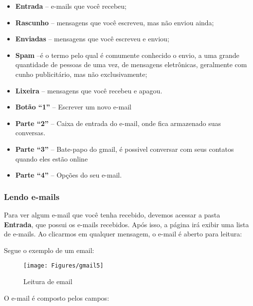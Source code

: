 \documentclass[hidelinks,12pt]{article}
\begin{document}
		\begin{itemize}
			\item \textbf{Entrada} – e-mails que você recebeu;
			
			\item \textbf{Rascunho} – mensagens que você escreveu, mas não enviou ainda;
			
			\item \textbf{Enviadas} – mensagens que você escreveu e enviou; 
			
			\item \textbf{Spam} –é o termo pelo qual é comumente conhecido o envio, a uma grande quantidade de pessoas de uma vez, de mensagens eletrônicas, geralmente com cunho publicitário, mas não exclusivamente;
			
			\item \textbf{Lixeira} – mensagens que você recebeu e apagou.
			
			\item \textbf{Botão “1”} – Escrever um novo e-mail
			
			\item \textbf{Parte “2”} – Caixa de entrada do e-mail, onde fica armazenado suas conversas.
			
			\item \textbf{Parte “3”} – Bate-papo do gmail, é possivel conversar com seus contatos quando eles estão online
			
			\item \textbf{Parte “4”} – Opções do seu e-mail.
			
		\end{itemize}
		
		
		\subsubsection{Lendo e-mails}
		
		Para ver algum e-mail que você tenha recebido, devemos acessar a pasta \textbf{Entrada}, que possui os e-mails recebidos. Após isso, a página irá exibir uma lista de e-mails. Ao clicarmos em qualquer mensagem, o e-mail é aberto para leitura: 
		
		Segue o exemplo de um email:
		
		\begin{figure}[!h]
			\centering
			\texttt{[image: Figures/gmail5]}
			\label{fig:gmail5}
			\caption{Leitura de email}
		\end{figure}
		
		O e-mail é composto pelos campos:
		
\end{document}
